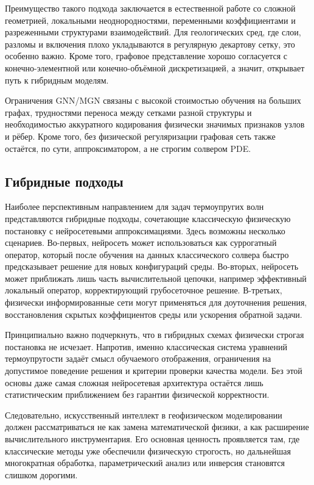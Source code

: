 Преимущество такого подхода заключается в естественной работе со сложной геометрией, локальными неоднородностями, переменными коэффициентами и разреженными структурами взаимодействий. Для геологических сред, где слои, разломы и включения плохо укладываются в регулярную декартову сетку, это особенно важно. Кроме того, графовое представление хорошо согласуется с конечно-элементной или конечно-объёмной дискретизацией, а значит, открывает путь к гибридным моделям.

Ограничения GNN/MGN связаны с высокой стоимостью обучения на больших графах, трудностями переноса между сетками разной структуры и необходимостью аккуратного кодирования физически значимых признаков узлов и рёбер. Кроме того, без физической регуляризации графовая сеть также остаётся, по сути, аппроксиматором, а не строгим солвером PDE.

\subsection*{Гибридные подходы}

Наиболее перспективным направлением для задач термоупругих волн представляются гибридные подходы, сочетающие классическую физическую постановку с нейросетевыми аппроксимациями. Здесь возможны несколько сценариев. Во-первых, нейросеть может использоваться как суррогатный оператор, который после обучения на данных классического солвера быстро предсказывает решение для новых конфигураций среды. Во-вторых, нейросеть может приближать лишь часть вычислительной цепочки, например эффективный локальный оператор, корректирующий грубосеточное решение. В-третьих, физически информированные сети могут применяться для доуточнения решения, восстановления скрытых коэффициентов среды или ускорения обратной задачи.

Принципиально важно подчеркнуть, что в гибридных схемах физически строгая постановка не исчезает. Напротив, именно классическая система уравнений термоупругости задаёт смысл обучаемого отображения, ограничения на допустимое поведение решения и критерии проверки качества модели. Без этой основы даже самая сложная нейросетевая архитектура остаётся лишь статистическим приближением без гарантии физической корректности.

Следовательно, искусственный интеллект в геофизическом моделировании должен рассматриваться не как замена математической физики, а как расширение вычислительного инструментария. Его основная ценность проявляется там, где классические методы уже обеспечили физическую строгость, но дальнейшая многократная обработка, параметрический анализ или инверсия становятся слишком дорогими.

